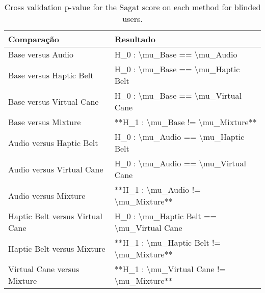 
\begin{table}[!htb]
\centering
\caption{Cross validation p-value for the Sagat score on each method for blinded users.}
\label{tab:lsd_sagat}
\begin{tabular}{ll}
\toprule
                     Comparação &                                 Resultado \\
\midrule
              Base versus Audio &               H\_0 : \textbackslash mu\_Base == \textbackslash mu\_Audio \\
        Base versus Haptic Belt &         H\_0 : \textbackslash mu\_Base == \textbackslash mu\_Haptic Belt \\
       Base versus Virtual Cane &        H\_0 : \textbackslash mu\_Base == \textbackslash mu\_Virtual Cane \\
            Base versus Mixture &         **H\_1 : \textbackslash mu\_Base != \textbackslash mu\_Mixture** \\
       Audio versus Haptic Belt &        H\_0 : \textbackslash mu\_Audio == \textbackslash mu\_Haptic Belt \\
      Audio versus Virtual Cane &       H\_0 : \textbackslash mu\_Audio == \textbackslash mu\_Virtual Cane \\
           Audio versus Mixture &        **H\_1 : \textbackslash mu\_Audio != \textbackslash mu\_Mixture** \\
Haptic Belt versus Virtual Cane & H\_0 : \textbackslash mu\_Haptic Belt == \textbackslash mu\_Virtual Cane \\
     Haptic Belt versus Mixture &  **H\_1 : \textbackslash mu\_Haptic Belt != \textbackslash mu\_Mixture** \\
    Virtual Cane versus Mixture & **H\_1 : \textbackslash mu\_Virtual Cane != \textbackslash mu\_Mixture** \\
\bottomrule
\end{tabular}
\end{table}

